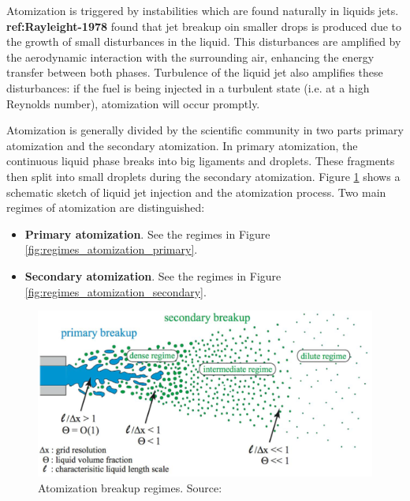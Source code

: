 Atomization is triggered by instabilities which are found naturally in liquids jets. \textbf{ref:Rayleight-1978} found that jet breakup oin smaller drops is produced due to the growth of small disturbances in the liquid. This disturbances are amplified by the aerodynamic interaction with the surrounding air, enhancing the energy transfer between both phases. Turbulence of the liquid jet also amplifies these disturbances: if the fuel is being injected in a turbulent state (i.e. at a high Reynolds number), atomization will occur promptly. 

Atomization is generally divided by the scientific community in two parts primary atomization and the secondary atomization. In primary atomization, the continuous liquid phase breaks into big ligaments and droplets. These fragments then split into small droplets during the secondary atomization. Figure \ref{fig:atomization_regimes_herrmann} shows a schematic sketch of liquid jet injection and the atomization process. Two main regimes of atomization are distinguished:

\begin{itemize}

	\item \textbf{Primary atomization}.  See the regimes in Figure \ref{fig:regimes_atomization_primary}.
	
	\item \textbf{Secondary atomization}.  See the regimes in Figure \ref{fig:regimes_atomization_secondary}.

\end{itemize}

\begin{figure}[h!]
	\centering
	\includegraphics[scale=0.5]{./part0_intro/atomization-regimes-scheme}
	\caption{Atomization breakup regimes. Source: }
	\label{fig:atomization_regimes_herrmann}
\end{figure}

